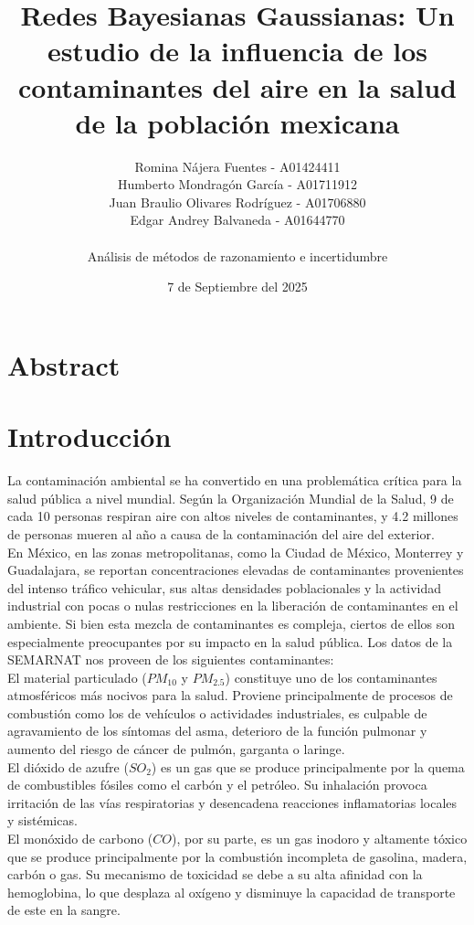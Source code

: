 \documentclass[12pt, letterpaper]{report}
\title{Redes Bayesianas Gaussianas: Un estudio de la influencia de los contaminantes del aire en la salud de la población mexicana}
\author{ Romina Nájera Fuentes - A01424411 \\ Humberto Mondragón García - A01711912 \\ Juan Braulio Olivares Rodríguez - A01706880 \\ Edgar Andrey Balvaneda - A01644770
 \\ \\ Análisis de métodos de razonamiento e incertidumbre}
\date{7 de Septiembre del 2025}
\begin{document}
\maketitle
\section*{Abstract}
\newpage

\section*{Introducción}

La contaminación ambiental se ha convertido en una problemática crítica para la salud pública a nivel mundial. Según la Organización Mundial de la Salud, 9 de cada 10 personas respiran aire con altos niveles de contaminantes, y 4.2 millones de personas mueren al año a causa de la contaminación del aire del exterior. \cite{who2018}
\\

En México, en las zonas metropolitanas, como la Ciudad de México, Monterrey y Guadalajara, se reportan concentraciones elevadas de contaminantes provenientes del intenso tráfico vehicular, sus altas densidades poblacionales y la actividad industrial con pocas o nulas restricciones en la liberación de contaminantes en el ambiente. Si bien esta mezcla de contaminantes es compleja, ciertos de ellos son especialmente preocupantes por su impacto en la salud pública. Los datos de la SEMARNAT nos proveen de los siguientes contaminantes:
\\

El material particulado ($PM_{10}$ y $PM_{2.5}$) constituye uno de los contaminantes atmosféricos más nocivos para la salud. Proviene principalmente de procesos de combustión como los de vehículos o actividades industriales, es culpable de agravamiento de los síntomas del asma, deterioro de la función pulmonar y aumento del riesgo de cáncer de pulmón, garganta o laringe.\cite{airly}
\\

El dióxido de azufre ($SO_2$) es un gas que se produce principalmente por la quema de combustibles fósiles como el carbón y el petróleo. Su inhalación provoca irritación de las vías respiratorias y desencadena reacciones inflamatorias locales y sistémicas. \cite{ivhhn2003}
\\

El monóxido de carbono ($CO$), por su parte, es un gas inodoro y altamente tóxico que se produce principalmente por la combustión incompleta de gasolina, madera, carbón o gas. Su mecanismo de toxicidad se debe a su alta afinidad con la hemoglobina, lo que desplaza al oxígeno y disminuye la capacidad de transporte de este en la sangre. \cite{mayoclinic2025}
\\
\end{document}
